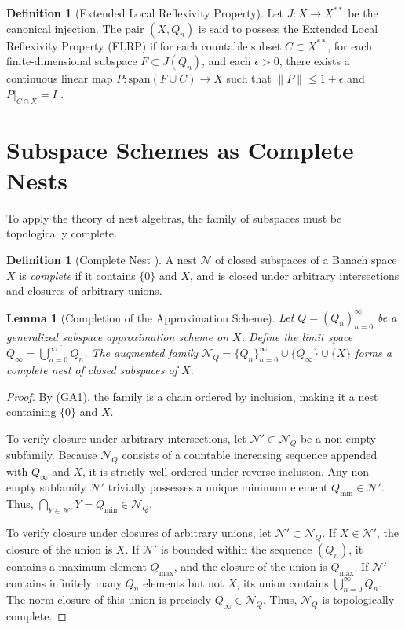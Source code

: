 \documentclass[11pt,reqno]{amsart}
\newtheorem{lemma}[theorem]{Lemma}
\theoremstyle{definition}
\newtheorem{definition}[theorem]{Definition}
\begin{document}
\begin{definition}[Extended Local Reflexivity Property] \label{def:elrp}
Let $J: X \to X^{**}$ be the canonical injection. The pair $(X, Q_n)$ is said to possess the Extended Local Reflexivity Property (ELRP) if for each countable subset $C \subset X^{**}$, for each finite-dimensional subspace $F \subset J(Q_n)$, and each $\epsilon > 0$, there exists a continuous linear map $P: \mathrm{span}(F \cup C) \to X$ such that $\|P\| \le 1 + \epsilon$ and $P|_{C \cap X} = I$ \cite{AT2023}.
\end{definition}

\section{Subspace Schemes as Complete Nests}

To apply the theory of nest algebras, the family of subspaces must be topologically complete. 

\begin{definition}[Complete Nest \cite{OV2017}]
A nest $\mathcal{N}$ of closed subspaces of a Banach space $X$ is \textit{complete} if it contains $\{0\}$ and $X$, and is closed under arbitrary intersections and closures of arbitrary unions.
\end{definition}

\begin{lemma}[Completion of the Approximation Scheme] \label{lem:nest_completion}
Let $Q = (Q_n)_{n=0}^\infty$ be a generalized subspace approximation scheme on $X$. Define the limit space $Q_\infty = \overline{\bigcup_{n=0}^\infty Q_n}$. The augmented family $\mathcal{N}_Q = \{Q_n\}_{n=0}^\infty \cup \{Q_\infty\} \cup \{X\}$ forms a complete nest of closed subspaces of $X$.
\end{lemma}

\begin{proof}
By (GA1), the family is a chain ordered by inclusion, making it a nest containing $\{0\}$ and $X$. 

To verify closure under arbitrary intersections, let $\mathcal{N}' \subset \mathcal{N}_Q$ be a non-empty subfamily. Because $\mathcal{N}_Q$ consists of a countable increasing sequence appended with $Q_\infty$ and $X$, it is strictly well-ordered under reverse inclusion. Any non-empty subfamily $\mathcal{N}'$ trivially possesses a unique minimum element $Q_{\min} \in \mathcal{N}'$. Thus, $\bigcap_{Y \in \mathcal{N}'} Y = Q_{\min} \in \mathcal{N}_Q$.

To verify closure under closures of arbitrary unions, let $\mathcal{N}' \subset \mathcal{N}_Q$. If $X \in \mathcal{N}'$, the closure of the union is $X$. If $\mathcal{N}'$ is bounded within the sequence $(Q_n)$, it contains a maximum element $Q_{\max}$, and the closure of the union is $Q_{\max}$. If $\mathcal{N}'$ contains infinitely many $Q_n$ elements but not $X$, its union contains $\bigcup_{n=0}^\infty Q_n$. The norm closure of this union is precisely $Q_\infty \in \mathcal{N}_Q$. Thus, $\mathcal{N}_Q$ is topologically complete.
\end{proof}
\end{document}
